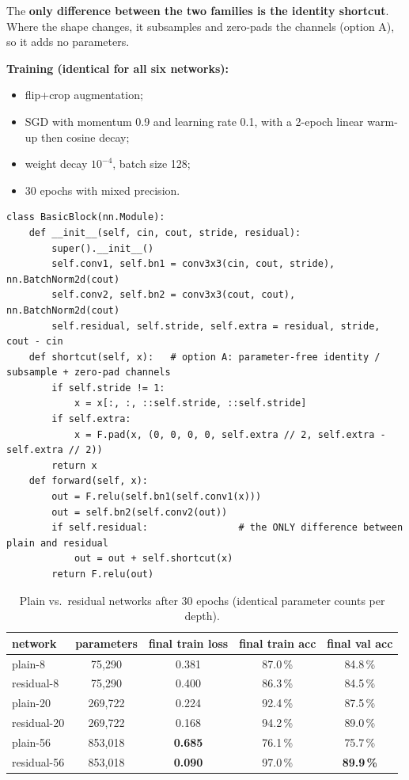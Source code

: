 \documentclass[11pt,a4paper]{article}
\begin{document}
The \textbf{only difference between the two families is the identity shortcut}. Where the shape changes, it subsamples and zero-pads the channels (option A), so it adds no parameters.

\textbf{Training (identical for all six networks):}
\begin{itemize}
  \item flip+crop augmentation;
  \item SGD with momentum 0.9 and learning rate 0.1, with a 2-epoch linear warm-up then cosine decay;
  \item weight decay $10^{-4}$, batch size 128;
  \item 30 epochs with mixed precision.
\end{itemize}

\begin{lstlisting}
class BasicBlock(nn.Module):
    def __init__(self, cin, cout, stride, residual):
        super().__init__()
        self.conv1, self.bn1 = conv3x3(cin, cout, stride), nn.BatchNorm2d(cout)
        self.conv2, self.bn2 = conv3x3(cout, cout), nn.BatchNorm2d(cout)
        self.residual, self.stride, self.extra = residual, stride, cout - cin
    def shortcut(self, x):   # option A: parameter-free identity / subsample + zero-pad channels
        if self.stride != 1:
            x = x[:, :, ::self.stride, ::self.stride]
        if self.extra:
            x = F.pad(x, (0, 0, 0, 0, self.extra // 2, self.extra - self.extra // 2))
        return x
    def forward(self, x):
        out = F.relu(self.bn1(self.conv1(x)))
        out = self.bn2(self.conv2(out))
        if self.residual:                # the ONLY difference between plain and residual
            out = out + self.shortcut(x)
        return F.relu(out)
\end{lstlisting}

\begin{table}[H]
\centering
\caption{Plain vs.\ residual networks after 30 epochs (identical parameter counts per depth).}
\begin{tabular}{lcccc}
\toprule
network & parameters & final train loss & final train acc & final val acc\\
\midrule
plain-8 & 75{,}290 & 0.381 & 87.0\,\% & 84.8\,\%\\
residual-8 & 75{,}290 & 0.400 & 86.3\,\% & 84.5\,\%\\
plain-20 & 269{,}722 & 0.224 & 92.4\,\% & 87.5\,\%\\
residual-20 & 269{,}722 & 0.168 & 94.2\,\% & 89.0\,\%\\
plain-56 & 853{,}018 & \textbf{0.685} & 76.1\,\% & 75.7\,\%\\
residual-56 & 853{,}018 & \textbf{0.090} & 97.0\,\% & \textbf{89.9\,\%}\\
\bottomrule
\end{tabular}
\end{table}
\end{document}
